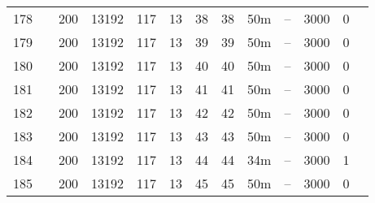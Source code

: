 \documentclass{article}
\begin{document}
\begin{longtable}{|l |l |l |l |l |l |l |l |l |l |l |l |l |}
178&&200&13192&117&13&38&38&50m&--&3000&0&\\
179&&200&13192&117&13&39&39&50m&--&3000&0&\\
180&&200&13192&117&13&40&40&50m&--&3000&0&\\
181&&200&13192&117&13&41&41&50m&--&3000&0&\\
182&&200&13192&117&13&42&42&50m&--&3000&0&\\
183&&200&13192&117&13&43&43&50m&--&3000&0&\\
184&&200&13192&117&13&44&44&34m&--&3000&1&\\
185&&200&13192&117&13&45&45&50m&--&3000&0&\\
\hline
\end{longtable}
\end{document}
